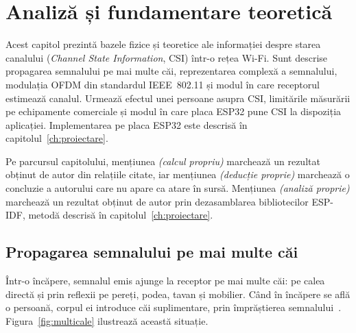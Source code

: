 \chapter{Analiză și fundamentare teoretică}
\label{ch:analysis}
\pagestyle{fancy}

Acest capitol prezintă bazele fizice și teoretice ale informației despre starea canalului (\emph{Channel State Information}, CSI) într-o rețea Wi-Fi.
Sunt descrise propagarea semnalului pe mai multe căi, reprezentarea complexă a semnalului, modulația OFDM din standardul IEEE~802.11 și modul în care receptorul estimează canalul.
Urmează efectul unei persoane asupra CSI, limitările măsurării pe echipamente comerciale și modul în care placa ESP32 pune CSI la dispoziția aplicației.
Implementarea pe placa ESP32 este descrisă în capitolul~\ref{ch:proiectare}.

Pe parcursul capitolului, mențiunea \emph{(calcul propriu)} marchează un rezultat obținut de autor din relațiile citate, iar mențiunea \emph{(deducție proprie)} marchează o concluzie a autorului care nu apare ca atare în sursă.
Mențiunea \emph{(analiză proprie)} marchează un rezultat obținut de autor prin dezasamblarea bibliotecilor ESP-IDF, metodă descrisă în capitolul~\ref{ch:proiectare}.

\section{Propagarea semnalului pe mai multe căi}\label{sec:multicale}

Într-o încăpere, semnalul emis ajunge la receptor pe mai multe căi: pe calea directă și prin reflexii pe pereți, podea, tavan și mobilier.
Când în încăpere se află o persoană, corpul ei introduce căi suplimentare, prin împrăștierea semnalului~\cite[Sec.~3.1]{zhang2015antifall}.
Figura~\ref{fig:multicale} ilustrează această situație.

